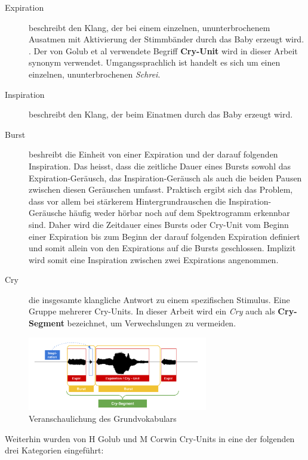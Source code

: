 \begin{description}
	\item[Expiration] beschreibt den Klang, der bei einem einzelnen, ununterbrochenem Ausatmen mit Aktivierung der Stimmbänder durch das Baby erzeugt wird. \cite{rythmic}. Der von Golub et al \cite{cryModel} verwendete Begriff \textbf{Cry-Unit} wird in dieser Arbeit synonym verwendet. Umgangssprachlich ist handelt es sich um einen einzelnen, ununterbrochenen \emph{Schrei}.
	\item[Inspiration] beschreibt den Klang, der beim Einatmen durch das Baby erzeugt wird.
	\item[Burst] beshreibt die Einheit von einer Expiration und der darauf folgenden Inspiration. Das heisst, dass die zeitliche Dauer eines Bursts sowohl das Expiration-Geräusch, das Inspiration-Geräusch als auch die beiden Pausen zwischen diesen Geräuschen umfasst. Praktisch ergibt sich das Problem, dass vor allem bei stärkerem Hintergrundrauschen die Inspiration-Geräusche häufig weder hörbar noch auf dem Spektrogramm erkennbar sind. Daher wird die Zeitdauer eines Bursts oder Cry-Unit vom Beginn einer Expiration bis zum Beginn der darauf folgenden Expiration definiert und somit allein von den Expirations auf die Bursts geschlossen. Implizit wird somit eine Inspiration zwischen zwei Expirations angenommen.
	\item[Cry] die insgesamte klangliche Antwort zu einem spezifischen Stimulus. Eine Gruppe mehrerer Cry-Units.\cite{cryModel} In dieser Arbeit wird ein \emph{Cry} auch als \textbf{Cry-Segment} bezeichnet, um Verwechslungen zu vermeiden.
\end{description}

\begin{figure}
	\centering
	\includegraphics[width=0.7\textwidth]{bilder/cryVoc02.png}
	\caption{Veranschaulichung des Grundvokabulars}
	\label{img:cryVocabulary}
\end{figure}

Weiterhin wurden von H Golub und M Corwin \cite{cryModel} Cry-Units in eine der folgenden drei Kategorien eingeführt:


